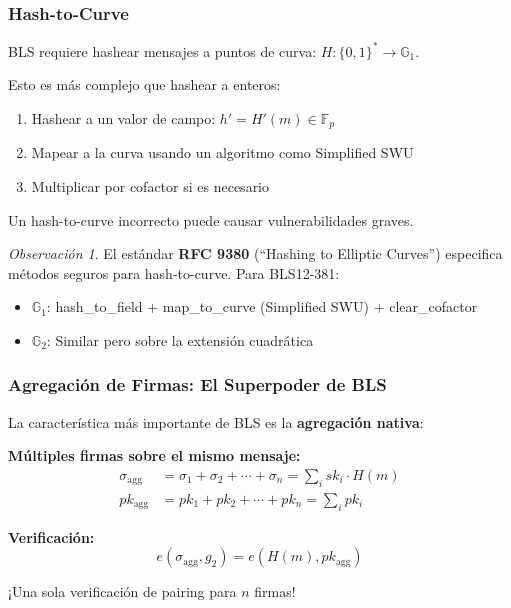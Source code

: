 \documentclass[11pt,a4paper,twoside,openright]{book}
\theoremstyle{definition}
\theoremstyle{plain}
\theoremstyle{remark}
\newtheorem{remark}{Observación}[chapter]
\newcommand{\Fp}{\mathbb{F}_p}
\newcommand{\G}{\mathbb{G}}
\begin{document}
\subsubsection{Hash-to-Curve}

\begin{advertencia}
BLS requiere hashear mensajes a puntos de curva: $H: \{0,1\}^* \to \G_1$.

Esto es más complejo que hashear a enteros:
\begin{enumerate}
    \item Hashear a un valor de campo: $h' = H'(m) \in \Fp$
    \item Mapear a la curva usando un algoritmo como Simplified SWU
    \item Multiplicar por cofactor si es necesario
\end{enumerate}

Un hash-to-curve incorrecto puede causar vulnerabilidades graves.
\end{advertencia}

\begin{remark}
El estándar \textbf{RFC 9380} (``Hashing to Elliptic Curves'') especifica métodos seguros para hash-to-curve. Para BLS12-381:
\begin{itemize}
    \item $\G_1$: hash\_to\_field + map\_to\_curve (Simplified SWU) + clear\_cofactor
    \item $\G_2$: Similar pero sobre la extensión cuadrática
\end{itemize}
\end{remark}

\subsubsection{Agregación de Firmas: El Superpoder de BLS}

\begin{keyidea}
La característica más importante de BLS es la \textbf{agregación nativa}:

\textbf{Múltiples firmas sobre el mismo mensaje:}
\begin{align}
\sigma_{\text{agg}} &= \sigma_1 + \sigma_2 + \cdots + \sigma_n = \sum_i sk_i \cdot H(m) \\
pk_{\text{agg}} &= pk_1 + pk_2 + \cdots + pk_n = \sum_i pk_i
\end{align}

\textbf{Verificación:}
\[ e(\sigma_{\text{agg}}, g_2) = e(H(m), pk_{\text{agg}}) \]

¡Una sola verificación de pairing para $n$ firmas!
\end{keyidea}
\end{document}
